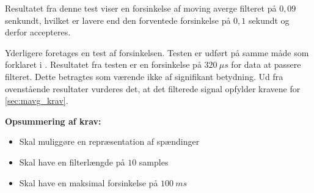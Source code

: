 \noindent
Resultatet fra denne test viser en forsinkelse af moving averge filteret på $0,09$ senkundt, hvilket er lavere end den forventede forsinkelse på $0,1$ sekundt og derfor accepteres. 

Yderligere foretages en test af forsinkelsen. Testen er udført på samme måde som forklaret i . Resultatet fra testen er en forsinkelse på $320~\mu s$ for data at passere filteret. Dette betragtes som værende ikke af signifikant betydning.    
Ud fra ovenstående resultater vurderes det, at det filterede signal opfylder kravene for \autoref{sec:mavg_krav}. 


\vspace{3mm}
\textbf{Opsummering af krav:}
\begin{itemize}
\item[\text{\sffamily \checkmark}] Skal muliggøre en repræsentation af spændinger 
\item[\text{\sffamily \checkmark}] Skal have en filterlængde på $10$ samples
\item[\text{\sffamily \checkmark}] Skal have en maksimal forsinkelse på $100~ms$
\end{itemize}